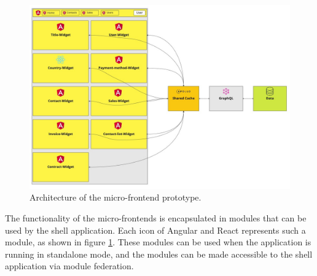 \ifshowImages
\begin{figure}[H]
\centering
\includegraphics[width=0.8\linewidth]{images/ui-dashboard-architecture.jpeg}
\caption{Architecture of the micro-frontend prototype.}\label{figure:methods:ui-dashboard-architecture}
\end{figure}
\fi

The functionality of the micro-frontends is encapsulated in modules that can be used by the shell application. Each icon of Angular and React represents such a module, as shown in figure \ref{figure:methods:ui-dashboard-architecture}. These modules can be used when the application is running in standalone mode, and the modules can be made accessible to the shell application via module federation.

\ifshowUnusedContent



